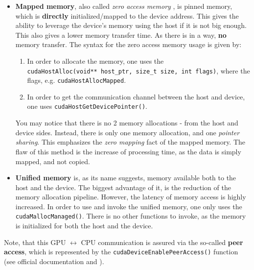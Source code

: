 \begin{itemize}
   \item \textbf{Mapped memory}, also called \textit{zero access memory}
     \cite{memory_model}, is pinned memory, which is \textbf{directly} initialized/mapped to the device address. 
    This gives the ability to leverage the device's memory using the host if it is not big enough.
    This also gives a lower memory transfer time. As there is in a way, \textbf{no} memory transfer.
    The syntax for the zero access memory usage is given by:
      \begin{enumerate}
        \item In order to allocate the memory, one uses the \\
          \verb|cudaHostAlloc(void** host_ptr, size_t size, int flags)|, where the flags, e.g. \verb|cudaHostAllocMapped|.
        \item In order to get the communication channel between the host and device, one uses 
          \verb|cudaHostGetDevicePointer()|.
      \end{enumerate}
    You may notice that there is no 2 memory allocations - from the host and device sides. Instead, 
    there is only one memory allocation, and one \textit{pointer sharing}. This emphasizes the \textit{zero mapping}
    fact of the mapped memory.
The flaw of this method is the increase of processing time, as the data is simply mapped, and not copied.

   \item \textbf{Unified memory} is, as its name suggests, memory available both to the host and the device. 
     The biggest advantage of it, is the reduction of the memory allocation pipeline. 
     However, the latency of memory access is highly increased. 
     In order to use and invoke the unified memory, one only uses the \verb|cudaMallocManaged()|. 
     There is no other functions to invoke, as the memory is initialized for both the host and the device.

   \label{mem_alloc}
 \end{itemize}
 Note, that this GPU $\leftrightarrow$ CPU communication is assured via the so-called \textbf{peer access}, 
 which is represented by the \verb|cudaDeviceEnablePeerAccess()| function (see official documentation \cite{center} and \cite{boreskov__nodate}).
  


